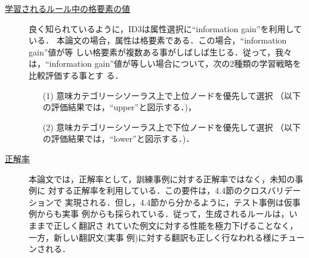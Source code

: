 \begin{description}
\item[\underline{学習されるルール中の格要素の値}]
良く知られているように，ID3は属性選択に``information gain''を利用している．
本論文の場合，属性は格要素である．この場合，``information gain''値が等
しい格要素が複数ある事がしばしば生じる．従って，我々は，``information
gain''値が等しい場合について，次の2種類の学習戦略を比較評価する事とす
る．

\begin{itemize}
\item[(1)] 意味カテゴリーシソーラス上で上位ノードを優先して選択
（以下の評価結果では，``upper''と図示する．)，
\item[(2)] 意味カテゴリーシソーラス上で下位ノードを優先して選択
（以下の評価結果では，``lower''と図示する．)．
\end{itemize}

\item[\underline{正解率}]
本論文では，正解率として，訓練事例に対する正解率ではなく，未知の事例に
対する正解率を利用している．この要件は，4.4節のクロスバリデーションで
実現される．但し，4.4節から分かるように，テスト事例は仮事例からも実事
例からも採られている．従って，生成されるルールは，いままで正しく翻訳さ
れていた例文に対する性能を極力下げることなく，一方，新しい翻訳文(実事
例)に対する翻訳も正しく行なわれる様にチューンされる．

\end{description}

